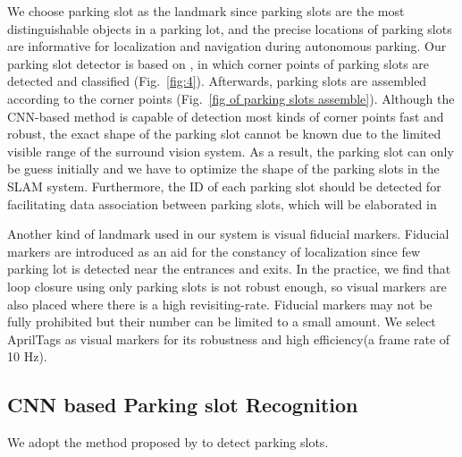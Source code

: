 \documentclass[journal]{IEEEtran}
\newcommand{\Reffig}[1]{Fig.~\ref{#1}}
\begin{document}
%

We choose parking slot as the landmark since parking slots are the most distinguishable objects in a parking lot, and the precise locations of parking slots are informative for localization and navigation during autonomous parking.
Our parking slot detector is based on \citep{Li2017Vision}, in which corner points of parking slots are detected and classified (\Reffig{fig:4}).
Afterwards, parking slots are assembled according to the corner points (\Reffig{fig of parking slots assemble}).
Although the CNN-based method is capable of detection  most kinds of corner points fast and robust, the exact shape of the parking slot cannot be known due to the limited visible range of the surround vision system.
As a result, the parking slot can only be guess initially and we have to optimize the shape of the parking slots in the SLAM system.
Furthermore, the ID of each parking slot should be detected for facilitating data association between parking slots, which will be elaborated in %

%

Another kind of landmark used in our system is visual fiducial markers.
Fiducial markers are introduced as an aid for the constancy of localization since few parking lot is detected near the entrances and exits. 
In the practice, we find that loop closure using only parking slots is not robust enough, so visual markers are also placed where there is a high revisiting-rate.
Fiducial markers may not be fully prohibited but their number can be limited to a small amount. 
We select AprilTags as visual markers for its robustness and high efficiency(a frame rate of 10 Hz)\citep{Olson2011AprilTag}.

\subsection{CNN based Parking slot Recognition}

We adopt the method proposed by \citep{Li2017Vision} to detect parking slots.
%
\end{document}
